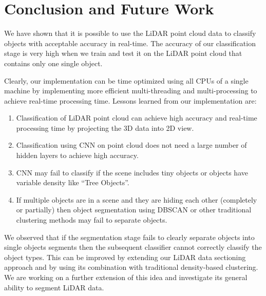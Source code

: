 \section{Conclusion and Future Work}\label{sec:conclusion}
We have shown that it is possible to use the LiDAR point cloud data to classify objects with
acceptable accuracy in real-time. The accuracy of our classification stage is very high when we train and test it on the LiDAR point cloud 
that contains only one single object.


Clearly, our implementation can be time optimized using all CPUs of a single machine by implementing more efficient multi-threading 
and multi-processing to achieve real-time processing time.  Lessons learned from our implementation are:
\begin{enumerate}
  \item Classification of LiDAR point cloud can achieve high accuracy and real-time processing time by projecting the 3D data into 2D view.
  \item Classification using CNN on point cloud does not need a large number of hidden layers to achieve high accuracy.
  \item CNN may fail to classify if the scene includes tiny objects or objects have variable density like ``Tree Objects''.
  \item If multiple objects are in a scene and they are hiding each other (completely or partially) then object segmentation using DBSCAN 
  or other traditional clustering methods may fail to separate objects.
\end{enumerate}

We observed that if the segmentation stage fails to clearly separate objects into single objects segments then the subsequent classifier cannot correctly classify the object types. This can be improved by extending our LiDAR data sectioning approach and by using its combination with traditional density-based clustering. We are working on a further extension of this idea and investigate its general ability to segment LiDAR data.  
